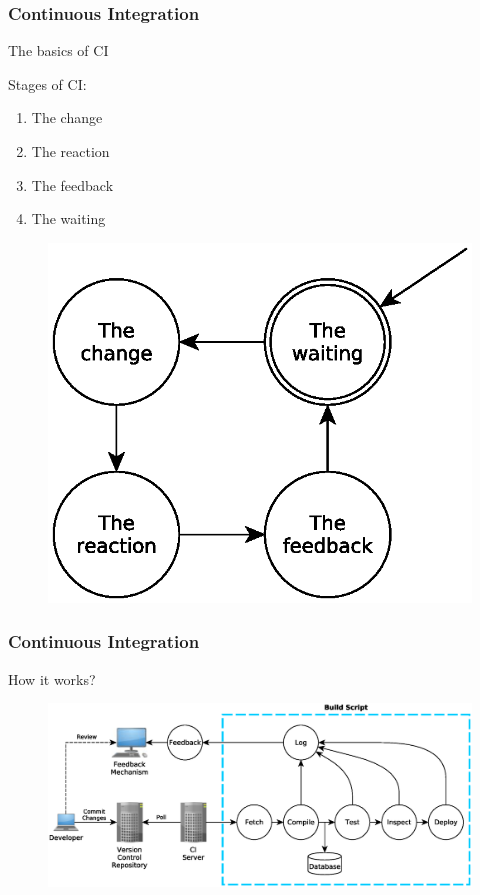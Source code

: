 \documentclass[10pt,xcolor=pdflatex]{beamer}
\begin{document}
\begin{frame}\frametitle{Continuous Integration}
	\begin{centering}
		\large{The basics of CI}\\[1em]
	\end{centering}
	\begin{multicols}{2}
		Stages of CI:
		\begin{enumerate}
			\item The change
			\item The reaction
			\item The feedback
			\item The waiting 
		\end{enumerate}
		\begin{figure}[H]
			\centering
			\includegraphics[scale=0.5]{eps/stages_of_ci.eps}
		\end{figure}
	\end{multicols}
\end{frame}

\begin{frame}\frametitle{Continuous Integration}
	\begin{centering}
		\large{How it works?}\\[1em]
	\end{centering}
	\begin{figure}[H]
		\centering
		\hspace{-1.7em} \includegraphics[scale=0.4]{eps/build_script.eps}
	\end{figure}
\end{frame}
\end{document}
